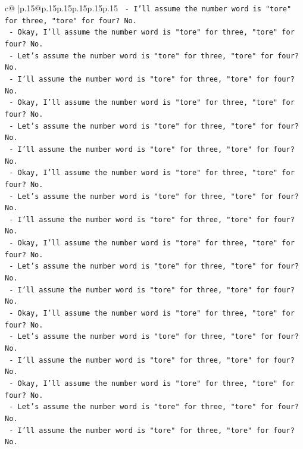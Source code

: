 \documentclass{article}
\begin{document}
{\begin{supertabular}{c@{$\;$}|p{.15\linewidth}@{}p{.15\linewidth}p{.15\linewidth}p{.15\linewidth}p{.15\linewidth}p{.15\linewidth}}
{{{\texttt{            {-} I'll assume the number word is "tore" for three, "tore" for four? No.} \\
\texttt{            {-} Okay, I'll assume the number word is "tore" for three, "tore" for four? No.} \\
\texttt{            {-} Let's assume the number word is "tore" for three, "tore" for four? No.} \\
\texttt{            {-} I'll assume the number word is "tore" for three, "tore" for four? No.} \\
\texttt{            {-} Okay, I'll assume the number word is "tore" for three, "tore" for four? No.} \\
\texttt{            {-} Let's assume the number word is "tore" for three, "tore" for four? No.} \\
\texttt{            {-} I'll assume the number word is "tore" for three, "tore" for four? No.} \\
\texttt{            {-} Okay, I'll assume the number word is "tore" for three, "tore" for four? No.} \\
\texttt{            {-} Let's assume the number word is "tore" for three, "tore" for four? No.} \\
\texttt{            {-} I'll assume the number word is "tore" for three, "tore" for four? No.} \\
\texttt{            {-} Okay, I'll assume the number word is "tore" for three, "tore" for four? No.} \\
\texttt{            {-} Let's assume the number word is "tore" for three, "tore" for four? No.} \\
\texttt{            {-} I'll assume the number word is "tore" for three, "tore" for four? No.} \\
\texttt{            {-} Okay, I'll assume the number word is "tore" for three, "tore" for four? No.} \\
\texttt{            {-} Let's assume the number word is "tore" for three, "tore" for four? No.} \\
\texttt{            {-} I'll assume the number word is "tore" for three, "tore" for four? No.} \\
\texttt{            {-} Okay, I'll assume the number word is "tore" for three, "tore" for four? No.} \\
\texttt{            {-} Let's assume the number word is "tore" for three, "tore" for four? No.} \\
\texttt{            {-} I'll assume the number word is "tore" for three, "tore" for four? No.} \\
}}}
\end{supertabular}}
\end{document}
